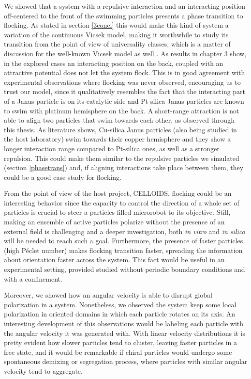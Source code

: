 \documentclass[../../master_thesis_np.tex]{subfiles}
\begin{document}
We showed that a system with a repulsive interaction and an interacting position off-centered to the front of the swimming particles presents a phase transition to flocking.
As stated in section \ref{3concl} this would make this kind of system a variation of the continuous Vicsek model, making it worthwhile to study its transition from the point of view of universality classes, which is a matter of discussion for the well-known Vicsek model as well \cite{jentsch_new_2024}.
As results in chapter 3 show, in the explored cases an interacting position on the back, coupled with an attractive potential does not let the system flock.
This is in good agreement with experimental observations where flocking was never observed, encouraging us to trust our model, since it qualitatively resembles the fact that the interacting part of a Janus particle is on its catalytic side and Pt-silica Janus particles are known to swim with platinum hemisphere on the back.
A short-range attraction is not able to align two particles that swim towards each other, as observed through this thesis.
As literature \cite{sharan_pair_2023} shows, Cu-silica Janus particles (also being studied in the host laboratory) swim towards their copper hemisphere and they show a longer interaction range compared to Pt-silica ones, as well as a stronger repulsion.
This could make them similar to the repulsive particles we simulated (section \ref{phasetrans}) and, if aligning interactions take place between them, they could be a good case study for flocking.

From the point of view of the host project, CELLOIDS, flocking could be an interesting behavior since the capacity to control the direction of a whole set of particles is crucial to steer a particles-filled microrobot to its objective.
Still, making an ensemble of active particles polarize without the presence of an external field is challenging and a deeper investigation, both \emph{in vitro} and \emph{in silico} will be needed to reach such a goal.
Furthermore, the presence of faster particles (high Péclet number) makes flocking transition faster, spreading the information about orientation faster across the system.
This fact would be useful in an experimental setting, provided studied without periodic boundary conditions and with a confinement.

Moreover, we showed how an angular velocity is able to disrupt global polarization in a system. 
Nonetheless, we observed the system keep some local polarization in oriented domains in which each particle rotates on its axis.
An interesting development of this observations would be labeling each particle with the angular velocity it was generated with.
With linear velocity distributions it is pretty evident how slower particles tend to cluster, leaving faster particles in a free state, and it would be remarkable if chiral particles would undergo some spontaneous demixing or segregation process, where particles with similar angular velocity tend to aggregate.
\end{document}

